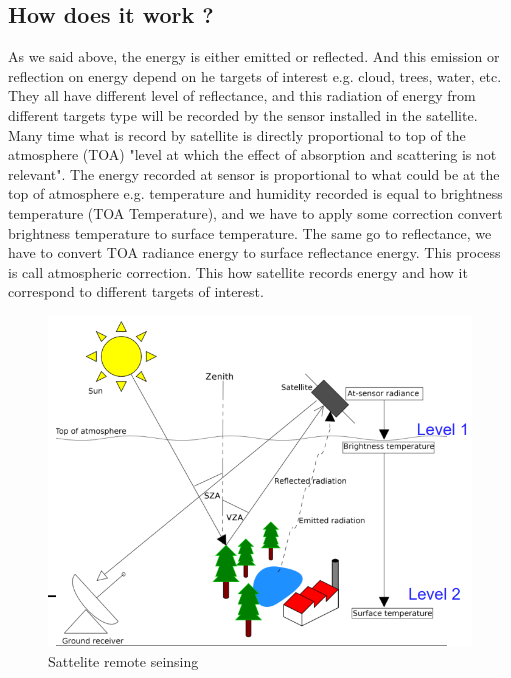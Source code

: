 \begin{description}
\section{How does it work ?}
As we said above, the energy is either emitted or reflected. And this emission or reflection on energy depend on he targets of interest e.g. cloud, trees, water, etc. They all have different level of reflectance, and this radiation of energy from different targets type will be recorded by the sensor installed in the satellite. Many time what is record by satellite is directly proportional to top of the atmosphere (TOA) "level at which the effect of absorption and scattering is not relevant". The energy recorded at sensor is proportional to what could be at the top of atmosphere e.g. temperature and humidity recorded is equal to brightness temperature (TOA Temperature), and we have to apply some correction convert brightness temperature to surface temperature. The same go to reflectance, we have to convert TOA radiance energy to surface reflectance energy. This process is call atmospheric correction. This how satellite records energy and how it correspond to different targets of interest.
\begin{figure}[H]
\begin{center}
\includegraphics[scale=0.8]{image4.png} %
\end{center}
\caption{Sattelite remote seinsing}
\label{Sattelite remote seinsing}%
\end{figure}

\end{description}
